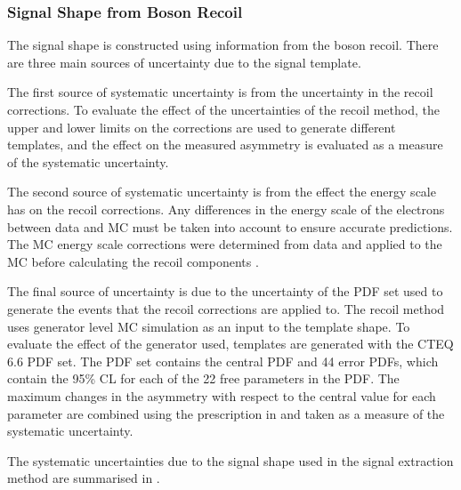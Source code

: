 \subsubsection{Signal \ETm Shape from Boson Recoil}

The signal \ETm shape is constructed using information from the boson recoil.
There are three main sources of uncertainty due to the signal template.

The first source of systematic uncertainty is from the uncertainty in the recoil
corrections.  To evaluate the effect of the uncertainties of the recoil method,
the upper and lower limits on the corrections are used to generate different
templates, and the effect on the measured asymmetry is evaluated as a measure of
the systematic uncertainty.

The second source of systematic uncertainty is from the effect the energy scale
has on the recoil corrections.  Any differences in the energy scale of the
electrons between data and {MC} must be taken into account to ensure accurate
\ETm predictions. The {MC} energy scale corrections were determined from \PZ
data and applied to the \PZ MC before calculating the recoil components
\cite{bauer2010modeling}.

The final source of uncertainty is due to the uncertainty of the {PDF} set used
to generate the events that the recoil corrections are applied to.  The recoil
method uses generator level {MC} simulation as an input to the template shape.
To evaluate the effect of the generator used, templates are generated with the
CTEQ 6.6 \cite{lai2010vv} PDF set.  The PDF set contains the central PDF and 44
error PDFs, which contain the \unit{95}{\%} {CL} for each of the 22 free
parameters in the {PDF}.  The maximum changes in the asymmetry with respect to
the central value for each parameter are combined using the prescription in
 and taken as a measure of the systematic
uncertainty.

The systematic uncertainties due to the signal \ETm shape used in the signal
extraction method are summarised in .

